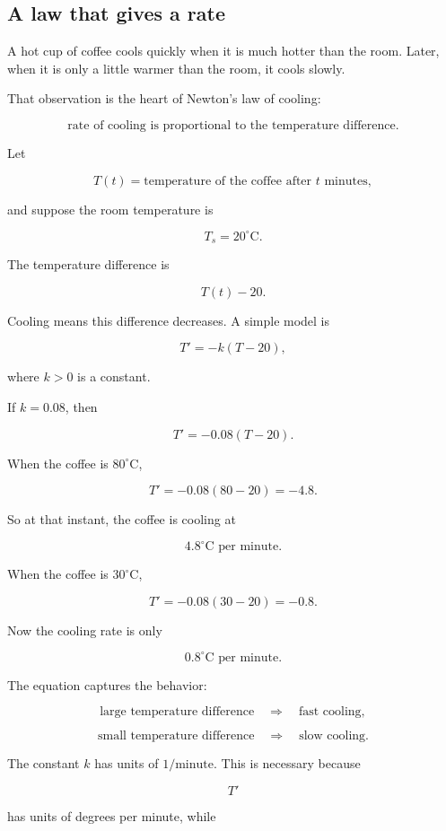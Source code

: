 \subsection{A law that gives a rate}
\label{subsec:law-gives-rate}

A hot cup of coffee cools quickly when it is much hotter than the room.  Later, when it
is only a little warmer than the room, it cools slowly.

That observation is the heart of Newton's law of cooling:

\[
\text{rate of cooling is proportional to the temperature difference}.
\]

Let

\[
T(t)=\text{temperature of the coffee after \(t\) minutes},
\]

and suppose the room temperature is

\[
T_s=20^\circ\text{C}.
\]

The temperature difference is

\[
T(t)-20.
\]

Cooling means this difference decreases.  A simple model is

\[
\boxed{
T'=-k(T-20),
}
\]

where \(k>0\) is a constant.

If \(k=0.08\), then

\[
T'=-0.08(T-20).
\]

When the coffee is \(80^\circ\text{C}\),

\[
T'=-0.08(80-20)=-4.8.
\]

So at that instant, the coffee is cooling at

\[
4.8^\circ\text{C per minute}.
\]

When the coffee is \(30^\circ\text{C}\),

\[
T'=-0.08(30-20)=-0.8.
\]

Now the cooling rate is only

\[
0.8^\circ\text{C per minute}.
\]

The equation captures the behavior:

\[
\text{large temperature difference} \quad\Longrightarrow\quad \text{fast cooling},
\]

\[
\text{small temperature difference} \quad\Longrightarrow\quad \text{slow cooling}.
\]

The constant \(k\) has units of \(1/\text{minute}\).  This is necessary because

\[
T'
\]

has units of degrees per minute, while

